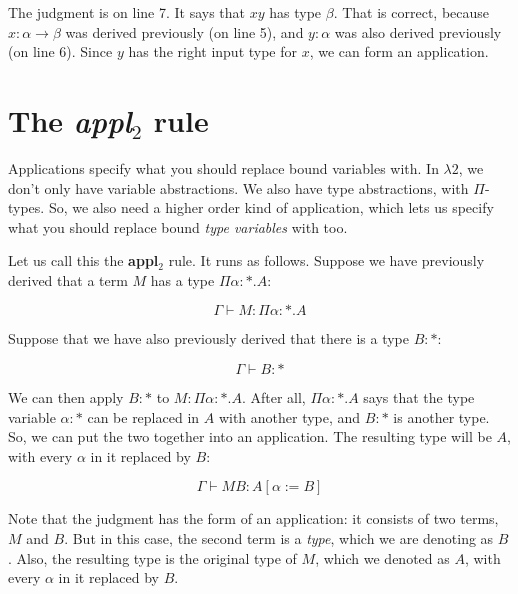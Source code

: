 \documentclass{book}
\numberwithin{equation}{chapter}
\newcommand{\vocab}{\textbf}
\begin{document}
\noindent
The judgment is on line 7. It says that $xy$ has type $\beta$. That is correct, because $x : \alpha \rightarrow \beta$ was derived previously (on line 5), and $y : \alpha$ was also derived previously (on line 6). Since $y$ has the right input type for $x$, we can form an application.


\section{The \textit{appl}$_{2}$ rule}

Applications specify what you should replace bound variables with. In $\lambda 2$, we don't only have variable abstractions. We also have type abstractions, with $\Pi$-types. So, we also need a higher order kind of application, which lets us specify what you should replace bound \textit{type variables} with too. 

Let us call this the \vocab{appl$_{2}$} rule. It runs as follows. Suppose we have previously derived that a term $M$ has a type $\Pi \alpha : *.A$:

\begin{equation}
\Gamma \vdash M : \Pi \alpha : *.A
\end{equation}

\noindent
Suppose that we have also previously derived that there is a type $B : *$:

\begin{equation}
\Gamma \vdash B : *
\end{equation}

\noindent
We can then apply $B : *$ to $M : \Pi \alpha : *.A$. After all, $\Pi \alpha : *.A$ says that the type variable $\alpha : *$ can be replaced in $A$ with another type, and $B : *$ is another type. So, we can put the two together into an application. The resulting type will be $A$, with every $\alpha$ in it replaced by $B$:

\begin{equation}
\Gamma \vdash M B : A[\alpha := B]
\end{equation}

\noindent
Note that the judgment has the form of an application: it consists of two terms, $M$ and $B$. But in this case, the second term is a \textit{type}, which we are denoting as $B$. Also, the resulting type is the original type of $M$, which we denoted as $A$, with every $\alpha$ in it replaced by $B$.
\end{document}
